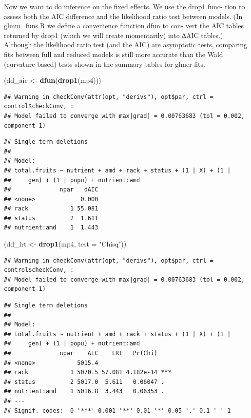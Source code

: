 \documentclass[
  12pt,
]{book}
\newenvironment{Shaded}{\begin{snugshade}}{\end{snugshade}}
\newcommand{\DataTypeTok}[1]{\textcolor[rgb]{0.13,0.29,0.53}{#1}}
\newcommand{\KeywordTok}[1]{\textcolor[rgb]{0.13,0.29,0.53}{\textbf{#1}}}
\newcommand{\NormalTok}[1]{#1}
\newcommand{\StringTok}[1]{\textcolor[rgb]{0.31,0.60,0.02}{#1}}
\begin{document}
Now we want to do inference on the fixed effects. We use the drop1 func- tion to assess both the AIC difference and the likelihood ratio test between models. (In glmm\_funs.R we define a convenience function dfun to con- vert the AIC tables returned by drop1 (which we will create momentarily) into ∆AIC tables.) Although the likelihood ratio test (and the AIC) are asymptotic tests, comparing fits between full and reduced models is still more accurate than the Wald (curvature-based) tests shown in the summary tables for glmer fits.

\begin{Shaded}
\begin{Highlighting}[]
\NormalTok{(dd_aic <-}\StringTok{ }\KeywordTok{dfun}\NormalTok{(}\KeywordTok{drop1}\NormalTok{(mp4)))}
\end{Highlighting}
\end{Shaded}

\begin{verbatim}
## Warning in checkConv(attr(opt, "derivs"), opt$par, ctrl = control$checkConv, :
## Model failed to converge with max|grad| = 0.00763683 (tol = 0.002, component 1)
\end{verbatim}

\begin{verbatim}
## Single term deletions
## 
## Model:
## total.fruits ~ nutrient + amd + rack + status + (1 | X) + (1 | 
##     gen) + (1 | popu) + nutrient:amd
##              npar   dAIC
## <none>             0.000
## rack            1 55.081
## status          2  1.611
## nutrient:amd    1  1.443
\end{verbatim}

\begin{Shaded}
\begin{Highlighting}[]
\NormalTok{(dd_lrt <-}\StringTok{ }\KeywordTok{drop1}\NormalTok{(mp4, }\DataTypeTok{test =} \StringTok{"Chisq"}\NormalTok{))}
\end{Highlighting}
\end{Shaded}

\begin{verbatim}
## Warning in checkConv(attr(opt, "derivs"), opt$par, ctrl = control$checkConv, :
## Model failed to converge with max|grad| = 0.00763683 (tol = 0.002, component 1)
\end{verbatim}

\begin{verbatim}
## Single term deletions
## 
## Model:
## total.fruits ~ nutrient + amd + rack + status + (1 | X) + (1 | 
##     gen) + (1 | popu) + nutrient:amd
##              npar    AIC    LRT   Pr(Chi)    
## <none>            5015.4                     
## rack            1 5070.5 57.081 4.182e-14 ***
## status          2 5017.0  5.611   0.06047 .  
## nutrient:amd    1 5016.8  3.443   0.06353 .  
## ---
## Signif. codes:  0 '***' 0.001 '**' 0.01 '*' 0.05 '.' 0.1 ' ' 1
\end{verbatim}
\end{document}
